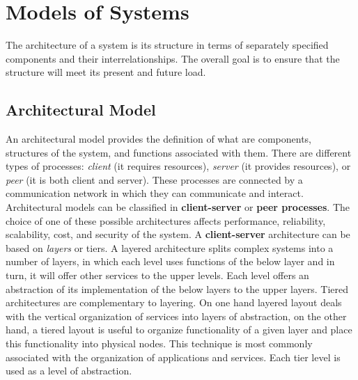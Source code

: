 \section{Models of Systems}
The architecture of a system is its structure in terms of separately specified components and their interrelationships. The overall goal is to ensure that the structure will meet its present and future load.
\subsection{Architectural Model}
An architectural model provides the definition of what are components, structures of the system, and functions associated with them. There are different types of processes: \textit{client} (it requires resources), \textit{server} (it provides resources), or \textit{peer} (it is both client and server). These processes are connected by a communication network in which they can communicate and interact. 
Architectural models can be classified in \textbf{client-server} or \textbf{peer processes}. The choice of one of these possible architectures affects performance, reliability, scalability, cost, and security of the system.
A \textbf{client-server} architecture can be based on \textit{layers} or tiers.
A layered architecture splits complex systems into a number of layers, in which each level uses functions of the below layer and in turn, it will offer other services to the upper levels. Each level offers an abstraction of its implementation of the below layers to the upper layers.
Tiered architectures are complementary to layering. On one hand layered layout deals with the vertical organization of services into layers of abstraction, on the other hand, a tiered layout is useful to organize functionality of a given layer and place this functionality into physical nodes. This technique is most commonly associated with the organization of applications and services. Each tier level is used as a level of abstraction.
